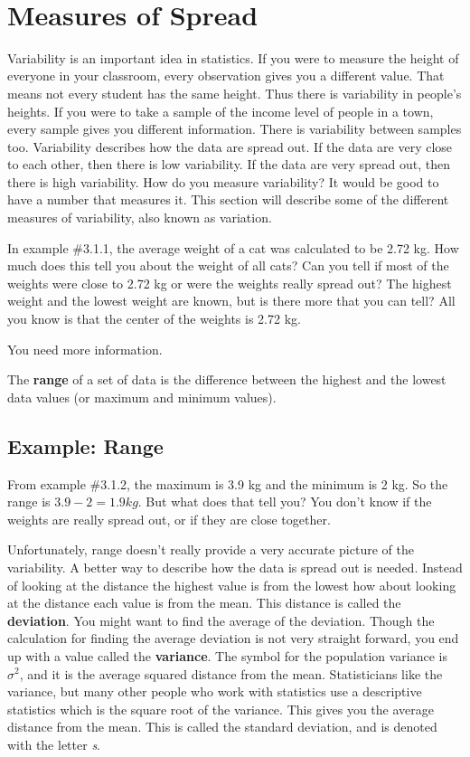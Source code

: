 \documentclass[]{book}
\begin{document}
\textbf{\\
}

\hypertarget{measures-of-spread}{%
\section{Measures of Spread}\label{measures-of-spread}}

Variability is an important idea in statistics. If you were to measure the height of everyone in your classroom, every observation gives you a different value. That means not every student has the same height. Thus there is variability in people's heights. If you were to take a sample of the income level of people in a town, every sample gives you different information. There is variability between samples too. Variability describes how the data are spread out. If the data are very close to each other, then there is low variability. If the data are very spread out, then there is high variability. How do you measure variability? It would be good to have a number that measures it. This section will describe some of the different measures of variability, also known as variation.

In example \#3.1.1, the average weight of a cat was calculated to be 2.72 kg. How much does this tell you about the weight of all cats? Can you tell if most of the weights were close to 2.72 kg or were the weights really spread out? The highest weight and the lowest weight are known, but is there more that you can tell? All you know is that the center of the weights is 2.72 kg.

You need more information.

The \textbf{range} of a set of data is the difference between the highest and the lowest data values (or maximum and minimum values).

\hypertarget{example-range}{%
\subsection{Example: Range}\label{example-range}}

From example \#3.1.2, the maximum is 3.9 kg and the minimum is 2 kg. So the range is \(3.9-2=1.9 kg\). But what does that tell you? You don't know if the weights are really spread out, or if they are close together.

Unfortunately, range doesn't really provide a very accurate picture of the variability. A better way to describe how the data is spread out is needed. Instead of looking at the distance the highest value is from the lowest how about looking at the distance each value is from the mean. This distance is called the \textbf{deviation}. You might want to find the average of the deviation. Though the calculation for finding the average deviation is not very straight forward, you end up with a value called the \textbf{variance}. The symbol for the population variance is \(\sigma^2\), and it is the average squared distance from the mean. Statisticians like the variance, but many other people who work with statistics use a descriptive statistics which is the square root of the variance. This gives you the average distance from the mean. This is called the standard deviation, and is denoted with the letter \emph{s}.
\end{document}
